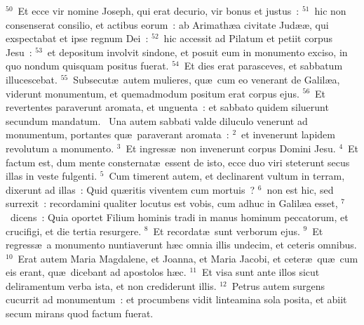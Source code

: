 ${}^{50}$~Et ecce vir nomine Joseph, qui erat decurio, vir bonus et justus~:
${}^{51}$~hic non consenserat consilio, et actibus eorum~: ab Arimath\ae a civitate Jud\ae \ae , qui exspectabat et ipse regnum Dei~:
${}^{52}$~hic accessit ad Pilatum et petiit corpus Jesu~:
${}^{53}$~et depositum involvit sindone, et posuit eum in monumento exciso, in quo nondum quisquam positus fuerat.
${}^{54}$~Et dies erat parasceves, et sabbatum illucescebat.
${}^{55}$~Subsecut\ae\ autem mulieres, qu\ae\ cum eo venerant de Galil\ae a, viderunt monumentum, et quemadmodum positum erat corpus ejus.
${}^{56}$~Et revertentes paraverunt aromata, et unguenta~: et sabbato quidem siluerunt secundum mandatum.
~Una autem sabbati valde diluculo venerunt ad monumentum, portantes qu\ae\ paraverant aromata~:
${}^{2}$~et invenerunt lapidem revolutum a monumento.
${}^{3}$~Et ingress\ae\ non invenerunt corpus Domini Jesu.
${}^{4}$~Et factum est, dum mente consternat\ae\ essent de isto, ecce duo viri steterunt secus illas in veste fulgenti.
${}^{5}$~Cum timerent autem, et declinarent vultum in terram, dixerunt ad illas~: Quid qu\ae ritis viventem cum mortuis~?
${}^{6}$~non est hic, sed surrexit~: recordamini qualiter locutus est vobis, cum adhuc in Galil\ae a esset,
${}^{7}$~dicens~: Quia oportet Filium hominis tradi in manus hominum peccatorum, et crucifigi, et die tertia resurgere.
${}^{8}$~Et recordat\ae\ sunt verborum ejus.
${}^{9}$~Et regress\ae\ a monumento nuntiaverunt h\ae c omnia illis undecim, et ceteris omnibus.
${}^{10}$~Erat autem Maria Magdalene, et Joanna, et Maria Jacobi, et ceter\ae\ qu\ae\ cum eis erant, qu\ae\ dicebant ad apostolos h\ae c.
${}^{11}$~Et visa sunt ante illos sicut deliramentum verba ista, et non crediderunt illis.
${}^{12}$~Petrus autem surgens cucurrit ad monumentum~: et procumbens vidit linteamina sola posita, et abiit secum mirans quod factum fuerat.


